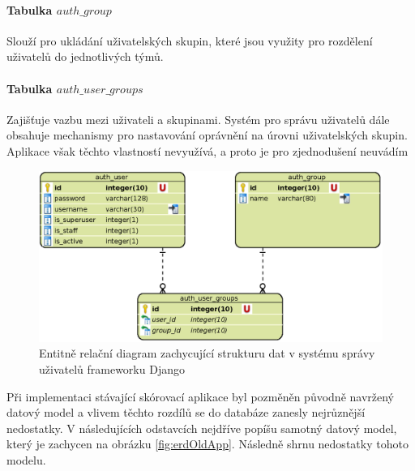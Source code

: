 \documentclass[
  digital,
  twoside,
  table, 
  nolof, 
  nolot
]{fithesis3}
\begin{document}
\paragraph{Tabulka $auth\_group$} Slouží pro ukládání uživatelských skupin, které jsou využity pro rozdělení uživatelů do jednotlivých týmů. 

\paragraph{Tabulka $auth\_user\_groups$} Zajišťuje vazbu mezi uživateli a skupinami. Systém pro správu uživatelů dále obsahuje mechanismy pro nastavování oprávnění na úrovni uživatelských skupin. Aplikace však těchto vlastností nevyužívá, a proto je pro zjednodušení neuvádím

\begin{figure}[h!]
    \centering
    \includegraphics[width=12cm]{images/ERD-django.eps}
    \caption{Entitně relační diagram zachycující strukturu dat v systému správy uživatelů frameworku Django}
    \label{fig:erdDjango}
\end{figure}

Při implementaci stávající skórovací aplikace byl pozměněn původně navržený datový model a vlivem těchto rozdílů se do databáze zanesly nejrůznější nedostatky. V následujících odstavcích nejdříve popíšu samotný datový model, který je zachycen na obrázku \ref{fig:erdOldApp}. Následně shrnu nedostatky tohoto modelu. 
\end{document}
